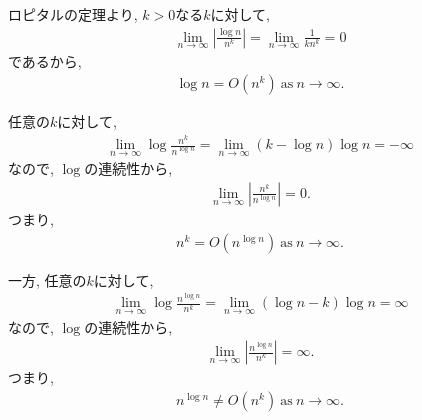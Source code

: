 \begin{ex}
    \label{ex3.11}
    ロピタルの定理より, $k > 0$なる$k$に対して,
    \begin{align*}
        \lim_{n \to \infty}  \left|\frac{\log n}{n^k}\right| = \lim_{n \to \infty} \frac{1}{kn^k} =  0
    \end{align*}
    であるから,
    \begin{align*}
        \log n = O\left( n^k\right)
        \mathrm{\ as\ } n \to \infty.
    \end{align*}
\end{ex}

\begin{ex}
    \label{ex3.12}
    任意の$k$に対して,
    \begin{align*}
        \lim_{n \to \infty} \log \frac{n^k}{n^{\log n}} =  \lim_{n \to \infty}  (k-\log n) \log n = - \infty
    \end{align*}
    なので, $\log$の連続性から,
    \begin{align*}
        \lim_{n \to \infty}  \left|\frac{n^k}{n^{\log n}}\right| = 0.
    \end{align*}
    つまり,
    \begin{align*}
        n^k = O (n^{\log n}) \mathrm{\ as\ } n \to \infty.
    \end{align*}
    \par
    一方,
    任意の$k$に対して,
    \begin{align*}
        \lim_{n \to \infty} \log \frac{n^{\log n}}{n^{k}} =  \lim_{n \to \infty}  (\log n - k) \log n =　\infty
    \end{align*}
    なので, $\log$の連続性から,
    \begin{align*}
        \lim_{n \to \infty}  \left|\frac{n^{\log n}}{n^k}\right| = \infty.
    \end{align*}
    つまり,
    \begin{align*}
        n^{\log n} \neq O (n^k) \mathrm{\ as\ } n \to \infty.
    \end{align*}
\end{ex}

